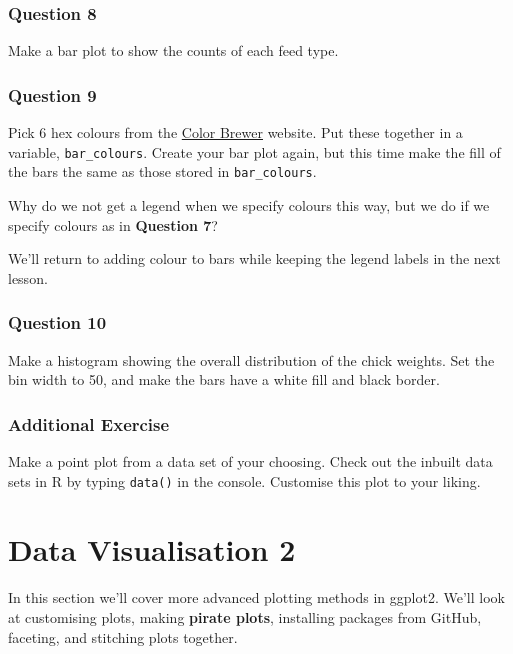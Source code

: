 \documentclass[
]{book}
\begin{document}
\hypertarget{question-8-1}{%
\subsection{Question 8}\label{question-8-1}}

Make a bar plot to show the counts of each feed type.

\hypertarget{question-9-1}{%
\subsection{Question 9}\label{question-9-1}}

Pick 6 hex colours from the \href{http://colorbrewer2.org/\#type=sequential\&scheme=BuGn\&n=3}{Color Brewer} website. Put these together in a variable, \texttt{bar\_colours}. Create your bar plot again, but this time make the fill of the bars the same as those stored in \texttt{bar\_colours}.

Why do we not get a legend when we specify colours this way, but we do if we specify colours as in \textbf{Question 7}?

We'll return to adding colour to bars while keeping the legend labels in the next lesson.

\hypertarget{question-10-1}{%
\subsection{Question 10}\label{question-10-1}}

Make a histogram showing the overall distribution of the chick weights. Set the bin width to 50, and make the bars have a white fill and black border.

\hypertarget{additional-exercise}{%
\subsection{Additional Exercise}\label{additional-exercise}}

Make a point plot from a data set of your choosing. Check out the inbuilt data sets in R by typing \texttt{data()} in the console. Customise this plot to your liking.

\hypertarget{data-visualisation-2}{%
\chapter{Data Visualisation 2}\label{data-visualisation-2}}

In this section we'll cover more advanced plotting methods in ggplot2. We'll look at customising plots, making \textbf{pirate plots}, installing packages from GitHub, faceting, and stitching plots together.
\end{document}
